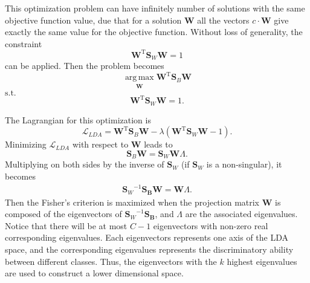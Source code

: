 This optimization problem can have infinitely number of solutions with the same objective function value, due that for a solution $\mathbf{W}$ all the vectors $c\cdot\mathbf{W}$ give exactly the same value for the objective function. Without loss of generality, the constraint
\begin{equation}
	\mathbf{W}^{\operatorname{T}}\mathbf{S}_W\mathbf{W}=1
\end{equation}
can be applied. Then the problem becomes
\begin{equation}
	\operatorname*{arg\,max}\limits_{\substack{\mathbf{W}}}\mathbf{W}^{\operatorname{T}}\mathbf{S}_B\mathbf{W}
\end{equation}
$\text{s.t.}$
\begin{equation}
	\mathbf{W}^{\operatorname{T}}\mathbf{S}_W\mathbf{W}=1.
\end{equation}

The Lagrangian for this optimization is
\begin{equation}
	\mathcal{L}_{LDA}=\mathbf{W}^{\operatorname{T}}\mathbf{S}_B\mathbf{W}-\lambda(\mathbf{W}^{\operatorname{T}}\mathbf{S}_W\mathbf{W}-1).
\end{equation}
Minimizing  $\mathcal{L}_{LDA}$ with respect to $\mathbf{W}$ leads to
\begin{equation}
	\mathbf{S}_B \mathbf{W}=\mathbf{S}_W \mathbf{W}\Lambda.
\end{equation}
Multiplying on both sides by the inverse of $\mathbf{S}_W$ (if $\mathbf{S}_W$ is a non-singular), it becomes
\begin{align}
	{\mathbf{S}_W}^{-1}\mathbf{S_B} \mathbf{W}=\mathbf{W}\Lambda.
\end{align}
Then the Fisher’s criterion is maximized when the projection matrix $\mathbf{W}$ is composed of the eigenvectors of ${\mathbf{S}_W}^{-1}\mathbf{S_B}$, and $\Lambda$ are the associated eigenvalues. Notice that there will be at most $C-1$ eigenvectors with non-zero real corresponding eigenvalues. Each eigenvectors represents one axis of the LDA space, and the corresponding eigenvalues represents the discriminatory ability between different classes. Thus, the eigenvectors with the $k$ highest eigenvalues are used to construct a lower dimensional space.